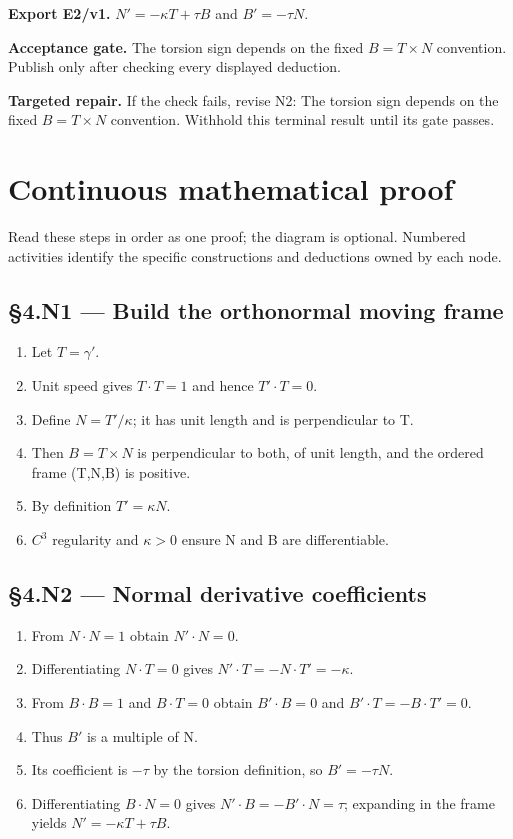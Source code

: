 \documentclass[preprint,12pt,aps,pra,showkeys,amsmath,amssymb,superscriptaddress,floatfix]{revtex4-2}
\theoremstyle{definition}
\theoremstyle{remark}
\newcommand{\field}[2]{\par\smallskip\noindent\textbf{#1.} #2\par}
\begin{document}
\field{Export E2/v1}{\(N'=-\kappa T+\tau B\) and \(B'=-\tau N\).}

\field{Acceptance gate}{The torsion sign depends on the fixed \(B=T\times N\) convention.
Publish only after checking every displayed deduction.}

\field{Targeted repair}{If the check fails, revise N2: The torsion sign depends on the fixed
\(B=T\times N\) convention. Withhold this terminal result until its gate
passes.}

\endgroup\clearpage\section{Continuous mathematical proof}\label{sec:proof}

Read these steps in order as one proof; the diagram is optional.
Numbered activities identify the specific constructions and deductions
owned by each node.

\subsection{§4.N1 --- Build the orthonormal moving
frame}\label{n1-build-the-orthonormal-moving-frame}

\begin{enumerate}
\def\labelenumi{\arabic{enumi}.}
\item
  Let \(T=\gamma '\).
\item
  Unit speed gives \(T\cdot T=1\) and hence \(T'\cdot T=0\).
\item
  Define \(N=T'/\kappa\); it has unit length and is perpendicular to T.
\item
  Then \(B=T\times N\) is perpendicular to both, of unit length, and the
  ordered frame (T,N,B) is positive.
\item
  By definition \(T'=\kappa N\).
\item
  \(C^{3}\) regularity and \(\kappa >0\) ensure N and B are
  differentiable.
\end{enumerate}

\subsection{§4.N2 --- Normal derivative
coefficients}\label{n2-normal-derivative-coefficients}

\begin{enumerate}
\def\labelenumi{\arabic{enumi}.}
\item
  From \(N\cdot N=1\) obtain \(N'\cdot N=0\).
\item
  Differentiating \(N\cdot T=0\) gives \(N'\cdot T=-N\cdot T'=-\kappa\).
\item
  From \(B\cdot B=1\) and \(B\cdot T=0\) obtain \(B'\cdot B=0\) and
  \(B'\cdot T=-B\cdot T'=0\).
\item
  Thus \(B'\) is a multiple of N.
\item
  Its coefficient is \(-\tau\) by the torsion definition, so
  \(B'=-\tau N\).
\item
  Differentiating \(B\cdot N=0\) gives \(N'\cdot B=-B'\cdot N=\tau\);
  expanding in the frame yields \(N'=-\kappa T+\tau B\).
\end{enumerate}
\end{document}
